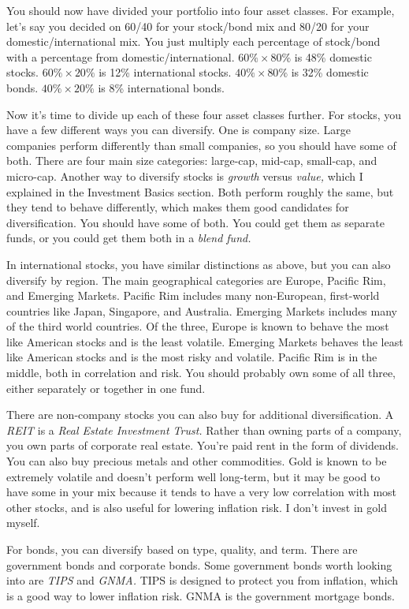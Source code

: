 You should now have divided your portfolio into four asset classes. For example, let's say you decided on 60/40 for your stock/bond mix and 80/20 for your domestic/international mix. You just multiply each percentage of stock/bond with a percentage from domestic/international. $60\% \times 80\%$ is 48\% domestic stocks. $60\% \times 20\%$ is 12\% international stocks. $40\% \times 80\%$ is 32\% domestic bonds. $40\% \times 20\%$ is 8\% international bonds.

Now it's time to divide up each of these four asset classes further. For stocks, you have a few different ways you can diversify. One is company size. Large companies perform differently than small companies, so you should have some of both. There are four main size categories: large-cap, mid-cap, small-cap, and micro-cap. Another way to diversify stocks is \emph{growth} versus \emph{value,} which I explained in the Investment Basics section. Both perform roughly the same, but they tend to behave differently, which makes them good candidates for diversification. You should have some of both. You could get them as separate funds, or you could get them both in a \emph{blend fund.}

In international stocks, you have similar distinctions as above, but you can also diversify by region. The main geographical categories are Europe, Pacific Rim, and Emerging Markets. Pacific Rim includes many non-European, first-world countries like Japan, Singapore, and Australia. Emerging Markets includes many of the third world countries. Of the three, Europe is known to behave the most like American stocks and is the least volatile. Emerging Markets behaves the least like American stocks and is the most risky and volatile. Pacific Rim is in the middle, both in correlation and risk. You should probably own some of all three, either separately or together in one fund.

There are non-company stocks you can also buy for additional diversification. A \emph{REIT} is a \emph{Real Estate Investment Trust.} Rather than owning parts of a company, you own parts of corporate real estate. You're paid rent in the form of dividends. You can also buy precious metals and other commodities. Gold is known to be extremely volatile and doesn't perform well long-term, but it may be good to have some in your mix because it tends to have a very low correlation with most other stocks, and is also useful for lowering inflation risk. I don't invest in gold myself.

For bonds, you can diversify based on type, quality, and term. There are government bonds and corporate bonds. Some government bonds worth looking into are \emph{TIPS} and \emph{GNMA.} TIPS is designed to protect you from inflation, which is a good way to lower inflation risk. GNMA is the government mortgage bonds.

